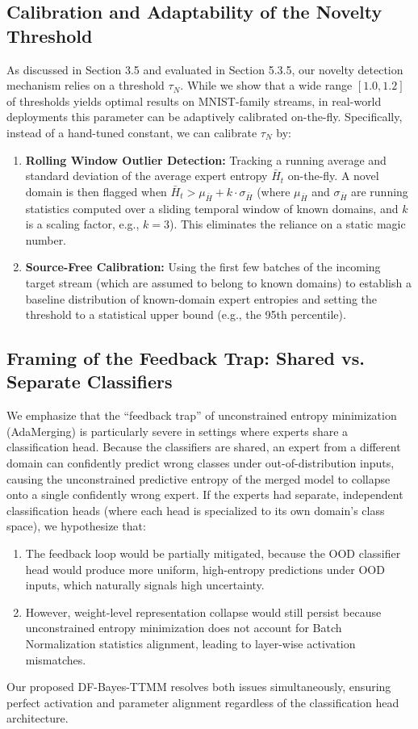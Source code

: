 \documentclass{article}
\theoremstyle{plain}
\theoremstyle{definition}
\theoremstyle{remark}
\begin{document}
\subsection{Calibration and Adaptability of the Novelty Threshold}
As discussed in Section 3.5 and evaluated in Section 5.3.5, our novelty detection mechanism relies
on a threshold $\tau_N$. While we show that a wide range $[1.0, 1.2]$ of thresholds yields optimal
results on MNIST-family streams, in real-world deployments this parameter can be adaptively
calibrated on-the-fly.
Specifically, instead of a hand-tuned constant, we can calibrate $\tau_N$ by:
\begin{enumerate}
\item \textbf{Rolling Window Outlier Detection:} Tracking a running average and standard deviation
of the average expert entropy $\bar{H}_t$ on-the-fly. A novel domain is then flagged when $\bar{H}_t
> \mu_{\bar{H}} + k \cdot \sigma_{\bar{H}}$ (where $\mu_{\bar{H}}$ and $\sigma_{\bar{H}}$ are
running statistics computed over a sliding temporal window of known domains, and $k$ is a scaling
factor, e.g., $k=3$). This eliminates the reliance on a static magic number.
\item \textbf{Source-Free Calibration:} Using the first few batches of the incoming target stream
(which are assumed to belong to known domains) to establish a baseline distribution of known-domain
expert entropies and setting the threshold to a statistical upper bound (e.g., the 95th percentile).
\end{enumerate}

\subsection{Framing of the Feedback Trap: Shared vs. Separate Classifiers}
We emphasize that the ``feedback trap'' of unconstrained entropy minimization (AdaMerging) is
particularly severe in settings where experts share a classification head. Because the classifiers
are shared, an expert from a different domain can confidently predict wrong classes under
out-of-distribution inputs, causing the unconstrained predictive entropy of the merged model to
collapse onto a single confidently wrong expert.
If the experts had separate, independent classification heads (where each head is specialized to
its own domain's class space), we hypothesize that:
\begin{enumerate}
\item The feedback loop would be partially mitigated, because the OOD classifier head would produce
more uniform, high-entropy predictions under OOD inputs, which naturally signals high uncertainty.
\item However, weight-level representation collapse would still persist because unconstrained
entropy minimization does not account for Batch Normalization statistics alignment, leading to
layer-wise activation mismatches.
\end{enumerate}
Our proposed DF-Bayes-TTMM resolves both issues simultaneously, ensuring perfect activation and
parameter alignment regardless of the classification head architecture.
\end{document}
